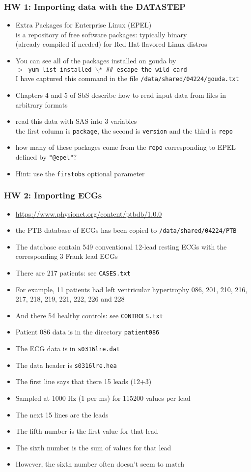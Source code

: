 \documentclass[11pt,pdftex,dvipsnames,usenames,helvetica]{beamer}
\begin{document}
\begin{frame}[fragile]
\frametitle{HW 1: Importing data with the DATASTEP}
\begin{itemize}
\item Extra Packages for Enterprise Linux (EPEL)\\
is a repository of free software packages: typically binary\\
(already compiled if needed) for Red Hat flavored Linux distros
\item You can see all of the packages installed on gouda by\\
{\tt $>$ yum list installed $\backslash$* \#\# escape the wild card}\\
I have captured this command in the file {\tt /data/shared/04224/gouda.txt} 
\item Chapters 4 and 5 of SbS describe how to read input
data from files in arbitrary formats
\item read this data with SAS into 3 variables\\
the first column is {\tt package}, the second is {\tt version}
and the third is {\tt repo}
\item how many of these packages come from the 
{\tt repo} corresponding to EPEL defined by {\tt "@epel"}?
\item Hint: use the {\tt firstobs} optional parameter
\end{itemize}
\end{frame}

\begin{frame}[fragile]
\frametitle{HW 2: Importing ECGs}
\begin{itemize}
\item \url{https://www.physionet.org/content/ptbdb/1.0.0}
\item the PTB database of ECGs has been copied to {\tt /data/shared/04224/PTB}
\item The database contain 549 conventional 12-lead resting ECGs 
with the corresponding 3 Frank lead ECGs
\item There are 217 patients: see {\tt CASES.txt}
\item For example, 11 patients had left ventricular hypertrophy
086, 201, 210, 216, 217, 218, 219,
221, 222, 226 and 228
\item And there 54 healthy controls: see {\tt CONTROLS.txt}
\item Patient 086 data is in the directory {\tt patient086}
\item The ECG data is in {\tt s0316lre.dat}
\item The data header is {\tt s0316lre.hea}
\item The first line says that there 15 leads (12+3)
\item Sampled at 1000 Hz (1 per ms) for 115200 values per lead
\item The next 15 lines are the leads
\item The fifth number is the first value for that lead
\item The sixth number is the sum of values for that lead
\item However, the sixth number often doesn't seem to match
\end{itemize}
\end{frame}
\end{document}
